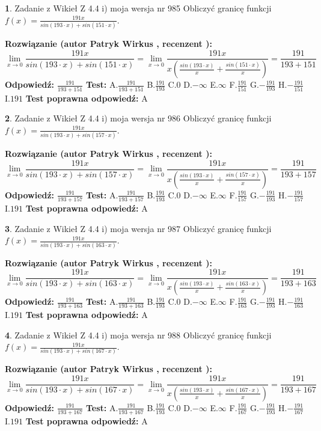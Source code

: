 \documentclass[12pt, a4paper]{article}
\theoremstyle{definition} %
\newtheorem{zad}{}
\newcommand{\zadStart}[1]{\begin{zad}#1\newline}
\newcommand{\zadStop}{\end{zad}}
\newcommand{\rozwStart}[2]{\noindent \textbf{Rozwiązanie (autor #1 , recenzent #2): }\newline}
\newcommand{\rozwStop}{\newline}
\newcommand{\odpStart}{\noindent \textbf{Odpowiedź:}\newline}
\newcommand{\odpStop}{\newline}
\newcommand{\testStart}{\noindent \textbf{Test:}\newline}
\newcommand{\testStop}{\newline}
\newcommand{\kluczStart}{\noindent \textbf{Test poprawna odpowiedź:}\newline}
\newcommand{\kluczStop}{\newline}
\begin{document}
\zadStart{Zadanie z Wikieł Z 4.4 i) moja wersja nr 985}
Obliczyć granicę funkcji $f(x)=\frac{191x}{sin(193\cdot x) +sin(151\cdot x)}$.
\zadStop
\rozwStart{Patryk Wirkus}{}
$$\lim\limits_{x\to 0}\frac{191x}{sin(193\cdot x) +sin(151\cdot x)}=\lim\limits_{x\to 0}\frac{191x}{x(\frac{sin(193\cdot x)}{x}+\frac{sin(151\cdot x)}{x})}=\frac{191}{193+151}$$
\rozwStop
\odpStart
$\frac{191}{193+151}$
\odpStop
\testStart
A.$\frac{191}{193+151}$
B.$\frac{191}{193}$
C.$0$
D.$-\infty$
E.$\infty$
F.$\frac{191}{151}$
G.$-\frac{191}{193}$
H.$-\frac{191}{151}$
I.$191$
\testStop
\kluczStart
A
\kluczStop



\zadStart{Zadanie z Wikieł Z 4.4 i) moja wersja nr 986}
Obliczyć granicę funkcji $f(x)=\frac{191x}{sin(193\cdot x) +sin(157\cdot x)}$.
\zadStop
\rozwStart{Patryk Wirkus}{}
$$\lim\limits_{x\to 0}\frac{191x}{sin(193\cdot x) +sin(157\cdot x)}=\lim\limits_{x\to 0}\frac{191x}{x(\frac{sin(193\cdot x)}{x}+\frac{sin(157\cdot x)}{x})}=\frac{191}{193+157}$$
\rozwStop
\odpStart
$\frac{191}{193+157}$
\odpStop
\testStart
A.$\frac{191}{193+157}$
B.$\frac{191}{193}$
C.$0$
D.$-\infty$
E.$\infty$
F.$\frac{191}{157}$
G.$-\frac{191}{193}$
H.$-\frac{191}{157}$
I.$191$
\testStop
\kluczStart
A
\kluczStop



\zadStart{Zadanie z Wikieł Z 4.4 i) moja wersja nr 987}
Obliczyć granicę funkcji $f(x)=\frac{191x}{sin(193\cdot x) +sin(163\cdot x)}$.
\zadStop
\rozwStart{Patryk Wirkus}{}
$$\lim\limits_{x\to 0}\frac{191x}{sin(193\cdot x) +sin(163\cdot x)}=\lim\limits_{x\to 0}\frac{191x}{x(\frac{sin(193\cdot x)}{x}+\frac{sin(163\cdot x)}{x})}=\frac{191}{193+163}$$
\rozwStop
\odpStart
$\frac{191}{193+163}$
\odpStop
\testStart
A.$\frac{191}{193+163}$
B.$\frac{191}{193}$
C.$0$
D.$-\infty$
E.$\infty$
F.$\frac{191}{163}$
G.$-\frac{191}{193}$
H.$-\frac{191}{163}$
I.$191$
\testStop
\kluczStart
A
\kluczStop



\zadStart{Zadanie z Wikieł Z 4.4 i) moja wersja nr 988}
Obliczyć granicę funkcji $f(x)=\frac{191x}{sin(193\cdot x) +sin(167\cdot x)}$.
\zadStop
\rozwStart{Patryk Wirkus}{}
$$\lim\limits_{x\to 0}\frac{191x}{sin(193\cdot x) +sin(167\cdot x)}=\lim\limits_{x\to 0}\frac{191x}{x(\frac{sin(193\cdot x)}{x}+\frac{sin(167\cdot x)}{x})}=\frac{191}{193+167}$$
\rozwStop
\odpStart
$\frac{191}{193+167}$
\odpStop
\testStart
A.$\frac{191}{193+167}$
B.$\frac{191}{193}$
C.$0$
D.$-\infty$
E.$\infty$
F.$\frac{191}{167}$
G.$-\frac{191}{193}$
H.$-\frac{191}{167}$
I.$191$
\testStop
\kluczStart
A
\kluczStop
\end{document}
